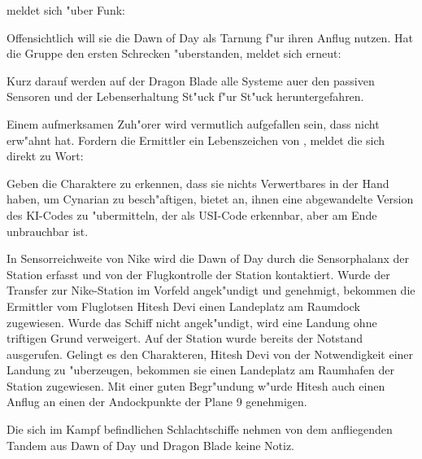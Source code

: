 \xl{} meldet sich "uber Funk:


Offensichtlich will sie die Dawn of Day als Tarnung f"ur ihren Anflug nutzen. Hat die Gruppe den ersten Schrecken "uberstanden, meldet sich \xl{} erneut:


Kurz darauf werden auf der Dragon Blade alle Systeme au\3er den passiven Sensoren und der Lebenserhaltung St"uck f"ur St"uck heruntergefahren. 

Einem aufmerksamen Zuh"orer wird vermutlich aufgefallen sein, dass \xl{} \ml{} nicht erw"ahnt hat. Fordern die Ermittler ein Lebenszeichen von \ml{}, meldet die sich direkt zu Wort:


Geben die Charaktere zu erkennen, dass sie nichts Verwertbares in der Hand haben, um Cynarian zu besch"aftigen, bietet \ml{} an, ihnen eine abgewandelte Version des KI-Codes zu "ubermitteln, der als USI-Code erkennbar, aber am Ende unbrauchbar ist.

In Sensorreichweite von Nike wird die Dawn of Day durch die Sensorphalanx der Station erfasst und von der Flugkontrolle der Station kontaktiert. Wurde der Transfer zur Nike-Station im Vorfeld angek"undigt und genehmigt, bekommen die Ermittler vom Fluglotsen Hitesh Devi einen Landeplatz am Raumdock zugewiesen. Wurde das Schiff nicht angek"undigt, wird eine Landung ohne triftigen Grund verweigert. Auf der Station wurde bereits der Notstand ausgerufen. Gelingt es den Charakteren, Hitesh Devi von der Notwendigkeit einer Landung zu "uberzeugen, bekommen sie einen Landeplatz am Raumhafen der Station zugewiesen. Mit einer guten Begr"undung w"urde Hitesh auch einen Anflug an einen der Andockpunkte der Plane 9 genehmigen.

Die sich im Kampf befindlichen Schlachtschiffe nehmen von dem anfliegenden Tandem aus Dawn of Day und Dragon Blade keine Notiz.

